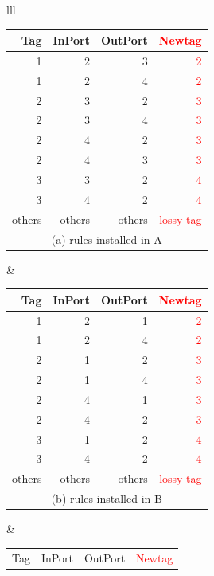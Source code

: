 \begin{table}[t]
\small
    \footnotesize
	\centering
	\begin{tabular}{lll}
		\begin{tabular}{|r|r|r|r|}
			\hline
			Tag&  InPort& OutPort & \textcolor{red}{Newtag} \\
			\hline
			\hline
			1 & 2 & 3 & \textcolor{red}{2} \\
			\hline
			1 & 2 & 4 & \textcolor{red}{2} \\
			\hline
			2 & 3 & 2 & \textcolor{red}{3} \\
			\hline
			2 & 3 & 4 & \textcolor{red}{3} \\
			\hline
			2 & 4 & 2 & \textcolor{red}{3} \\
			\hline
			2 & 4 & 3 & \textcolor{red}{3} \\
			\hline
			3 & 3 & 2& \textcolor{red}{4} \\
			\hline
			3 & 4 & 2 & \textcolor{red}{4} \\
			\hline
			others & others & others & \textcolor{red}{lossy tag} \\
			\hline
			\multicolumn{4}{c}{(a) rules installed in A} \\
		\end{tabular}
		&
		\begin{tabular}{|r|r|r|r|}
			\hline
			Tag&  InPort& OutPort & \textcolor{red}{Newtag} \\
			\hline
			\hline
			1 & 2 & 1 & \textcolor{red}{2} \\
			\hline
			1 & 2 & 4 & \textcolor{red}{2} \\
			\hline
			2 & 1 & 2 & \textcolor{red}{3} \\
			\hline
			2 & 1 & 4 & \textcolor{red}{3} \\
			\hline
			2 & 4 & 1 & \textcolor{red}{3} \\
			\hline
			2 & 4 & 2 & \textcolor{red}{3} \\
			\hline
			3 & 1 & 2& \textcolor{red}{4} \\
			\hline
			3 & 4 & 2 & \textcolor{red}{4} \\
			\hline
			others & others & others & \textcolor{red}{lossy tag} \\
			\hline
			\multicolumn{4}{c}{(b) rules installed in B} \\
		\end{tabular}
		&
		\begin{tabular}{|r|r|r|r|}
			\hline
			Tag&  InPort& OutPort & \textcolor{red}{Newtag} \\

\end{tabular}
\end{tabular}
\end{table}
